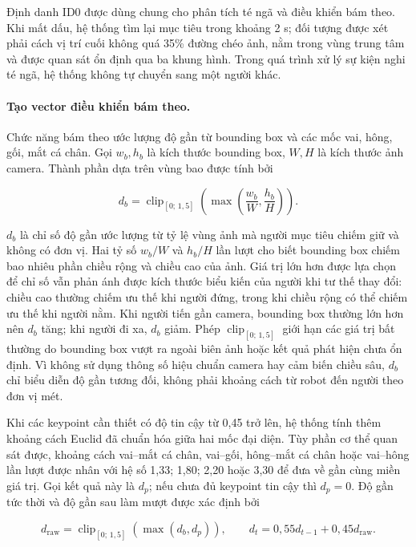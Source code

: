Định danh ID0 được dùng chung cho phân tích té ngã và điều khiển bám theo. Khi mất dấu, hệ thống tìm lại mục tiêu trong khoảng 2 s; đối tượng được xét phải cách vị trí cuối không quá 35\% đường chéo ảnh, nằm trong vùng trung tâm và được quan sát ổn định qua ba khung hình. Trong quá trình xử lý sự kiện nghi té ngã, hệ thống không tự chuyển sang một người khác.

\paragraph{Tạo vector điều khiển bám theo.}
Chức năng bám theo ước lượng độ gần từ bounding box và các mốc vai, hông, gối, mắt cá chân. Gọi $w_b,h_b$ là kích thước bounding box, $W,H$ là kích thước ảnh camera. Thành phần dựa trên vùng bao được tính bởi

\begin{equation}
d_b=\operatorname{clip}_{[0;\,1{,}5]}\!\left(\max\!\left(\frac{w_b}{W},\frac{h_b}{H}\right)\right).
\end{equation}

$d_b$ là chỉ số độ gần ước lượng từ tỷ lệ vùng ảnh mà người mục tiêu chiếm giữ và không có đơn vị. Hai tỷ số $w_b/W$ và $h_b/H$ lần lượt cho biết bounding box chiếm bao nhiêu phần chiều rộng và chiều cao của ảnh. Giá trị lớn hơn được lựa chọn để chỉ số vẫn phản ánh được kích thước biểu kiến của người khi tư thế thay đổi: chiều cao thường chiếm ưu thế khi người đứng, trong khi chiều rộng có thể chiếm ưu thế khi người nằm. Khi người tiến gần camera, bounding box thường lớn hơn nên $d_b$ tăng; khi người đi xa, $d_b$ giảm. Phép $\operatorname{clip}_{[0;\,1{,}5]}$ giới hạn các giá trị bất thường do bounding box vượt ra ngoài biên ảnh hoặc kết quả phát hiện chưa ổn định. Vì không sử dụng thông số hiệu chuẩn camera hay cảm biến chiều sâu, $d_b$ chỉ biểu diễn độ gần tương đối, không phải khoảng cách từ robot đến người theo đơn vị mét.

Khi các keypoint cần thiết có độ tin cậy từ 0,45 trở lên, hệ thống tính thêm khoảng cách Euclid đã chuẩn hóa giữa hai mốc đại diện. Tùy phần cơ thể quan sát được, khoảng cách vai--mắt cá chân, vai--gối, hông--mắt cá chân hoặc vai--hông lần lượt được nhân với hệ số 1,33; 1,80; 2,20 hoặc 3,30 để đưa về gần cùng miền giá trị. Gọi kết quả này là $d_p$; nếu chưa đủ keypoint tin cậy thì $d_p=0$. Độ gần tức thời và độ gần sau làm mượt được xác định bởi

\begin{equation}
d_{\mathrm{raw}}=\operatorname{clip}_{[0;\,1{,}5]}\!\left(\max(d_b,d_p)\right),\qquad
d_t=0{,}55d_{t-1}+0{,}45d_{\mathrm{raw}}.
\label{eq:tracking_distance_metric}
\end{equation}

